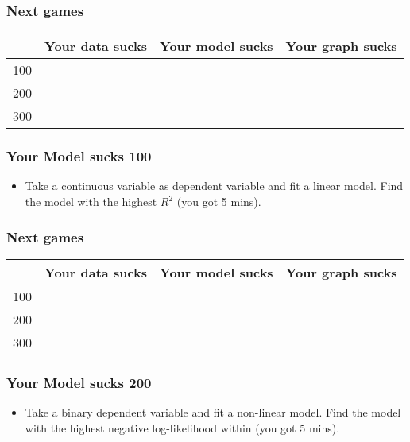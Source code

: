 \documentclass[xcolor=table,dvipsnames]{beamer}
\begin{document}
\begin{frame}
\frametitle{Next games}
\begin{table}[H]\centering
{\color{white} \begin{tabular}{|r|c|c|c|} \hline
\rowcolor{jeopardy} & Your data sucks & Your model sucks & Your graph sucks \\\hline
\rowcolor{jeopardy} 100 & & & \\\hline
\rowcolor{jeopardy} 200 & & & \\\hline
\rowcolor{jeopardy} 300 & &	& \\\hline
\end{tabular}}
\end{table}

\end{frame}	


\begin{frame}
\frametitle{Your Model sucks 100}
\begin{itemize}	
\item[] Take a continuous variable as dependent variable and fit a linear model. Find the model with the highest $R^2$ (you got 5 mins). 
\end{itemize}
\end{frame}	

\begin{frame}
\frametitle{Next games}
\begin{table}[H]\centering
{\color{white} \begin{tabular}{|r|c|c|c|} \hline
\rowcolor{jeopardy} & Your data sucks & Your model sucks & Your graph sucks \\\hline
\rowcolor{jeopardy} 100 & & & \\\hline
\rowcolor{jeopardy} 200 & & & \\\hline
\rowcolor{jeopardy} 300 & &	& \\\hline
\end{tabular}}
\end{table}

\end{frame}	


\begin{frame}
\frametitle{Your Model sucks 200}
\begin{itemize}	
\item[] Take a binary dependent variable and fit a non-linear model. Find the model with the highest negative log-likelihood within (you got 5 mins). 
\end{itemize}
\end{frame}	
\end{document}
